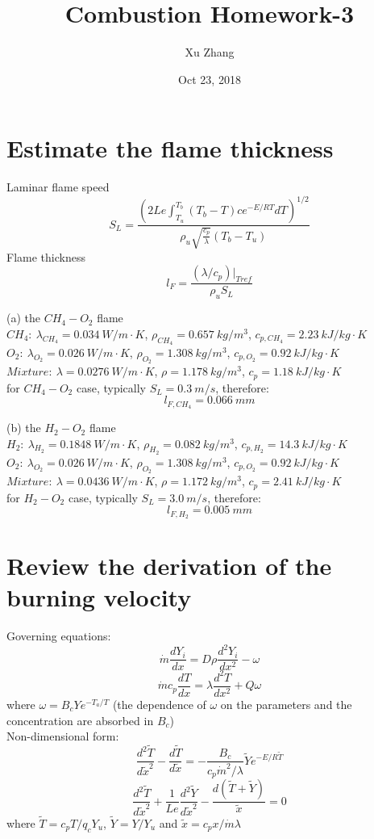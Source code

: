\documentclass[a4paper, 11pt]{article}
\title{Combustion Homework-3}
\author{Xu Zhang}
\date{Oct 23, 2018}
\begin{document}
\maketitle

\section{Estimate the flame thickness}
Laminar flame speed 
$$
S_L=\frac{(2Le\int_{T_u}^{T_b} (T_b-T)ce^{-E/RT}dT)^{1/2}}{{\rho}_u\sqrt{\frac{c_p}{\lambda}}(T_b-T_u)}
$$
Flame thickness
$$
l_F=\frac{(\lambda/c_p)|_{Tref}}{\rho_uS_L}
$$

(a) the $CH_4-O_2$ flame\\
$CH_4:\ \lambda_{CH_4}=0.034\ W/m\cdot K$, $\rho_{CH_4}=0.657\ kg/m^3$, $c_{p,CH_4}=2.23\ kJ/kg\cdot K$\\
$O_2:\ \lambda_{O_2}=0.026\ W/m\cdot K$, $\rho_{O_2}=1.308\ kg/m^3$, $c_{p,O_2}=0.92\ kJ/kg\cdot K$\\
$Mixture:\ \lambda=0.0276\ W/m\cdot K$, $\rho=1.178\ kg/m^3$, $c_p=1.18\ kJ/kg\cdot K$\\
for $CH_4-O_2$ case, typically $S_L=0.3\ m/s$, therefore:
$$
l_{F,CH_4}=0.066\ mm
$$

(b) the $H_2-O_2$ flame\\
$H_2:\ \lambda_{H_2}=0.1848\ W/m\cdot K$, $\rho_{H_2}=0.082\ kg/m^3$, $c_{p,H_2}=14.3\ kJ/kg\cdot K$\\
$O_2:\ \lambda_{O_2}=0.026\ W/m\cdot K$, $\rho_{O_2}=1.308\ kg/m^3$, $c_{p,O_2}=0.92\ kJ/kg\cdot K$\\
$Mixture:\ \lambda=0.0436\ W/m\cdot K$, $\rho=1.172\ kg/m^3$, $c_p=2.41\ kJ/kg\cdot K$\\
for $H_2-O_2$ case, typically $S_L=3.0\ m/s$, therefore:
$$
l_{F,H_2}=0.005\ mm
$$


\section{Review the derivation of the burning velocity}
Governing equations:
$$
    \dot{m} \frac{dY_i}{dx}=D\rho \frac{d^2Y_i}{dx^2} - \omega
$$
$$
    \dot{m} c_p \frac{dT}{dx}=\lambda \frac{d^2T}{dx^2} + Q \omega
$$
where $\omega = B_cYe^{-T_a/T}$ (the dependence of $\omega$ on the  parameters and the concentration are absorbed in $B_c$)\\
Non-dimensional form:
$$
    \frac{d^2\tilde{T}}{d\tilde{x}^2} - \frac{d\tilde{T}}{d\tilde{x}} = -\frac{B_c}{c_p\dot{m}^2/\lambda}\tilde{Y}e^{-E/R\tilde{T}}
$$
$$
    \frac{d^2\tilde{T}}{d\tilde{x}^2}+\frac{1}{Le}\frac{d^2\tilde{Y}}{d\tilde{x}^2}-\frac{d(\tilde{T}+\tilde{Y})}{\tilde{x}}=0
$$
where $\tilde{T}=c_pT/q_cY_u$, $\tilde{Y}=Y/Y_u$ and $\tilde{x}=c_px/\dot{m}\lambda$
\end{document}
